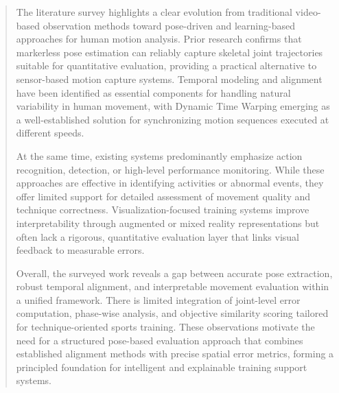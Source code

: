 \documentclass[
]{article}
\begin{document}
\begin{quote}
The literature survey highlights a clear evolution from traditional
video-based observation methods toward pose-driven and learning-based
approaches for human motion analysis. Prior research confirms that
markerless pose estimation can reliably capture skeletal joint
trajectories suitable for quantitative evaluation, providing a practical
alternative to sensor-based motion capture systems. Temporal modeling
and alignment have been identified as essential components for handling
natural variability in human movement, with Dynamic Time Warping
emerging as a well-established solution for synchronizing motion
sequences executed at different speeds.

At the same time, existing systems predominantly emphasize action
recognition, detection, or high-level performance monitoring. While
these approaches are effective in identifying activities or abnormal
events, they offer limited support for detailed assessment of movement
quality and technique correctness. Visualization-focused training
systems improve interpretability through augmented or mixed reality
representations but often lack a rigorous, quantitative evaluation layer
that links visual feedback to measurable errors.

Overall, the surveyed work reveals a gap between accurate pose
extraction, robust temporal alignment, and interpretable movement
evaluation within a unified framework. There is limited integration of
joint-level error computation, phase-wise analysis, and objective
similarity scoring tailored for technique-oriented sports training.
These observations motivate the need for a structured pose-based
evaluation approach that combines established alignment methods with
precise spatial error metrics, forming a principled foundation for
intelligent and explainable training support systems.
\end{quote}
\end{document}
